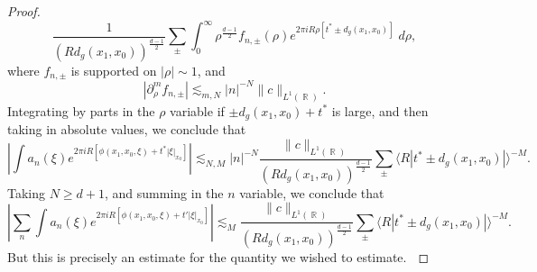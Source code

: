 \documentclass[dvipsnames,letterpaper,12pt]{article}
\DeclareMathOperator{\RR}{\mathbb{R}}
\begin{document}
\begin{proof}
    \[ \frac{1}{\left( R d_g(x_1,x_0) \right)^{\frac{d-1}{2}}} \sum_{\pm} \int_0^\infty \rho^{\frac{d-1}{2}} f_{n,\pm}(\rho) e^{2 \pi i R \rho [ t^* \pm d_g(x_1,x_0)]}\; d\rho, \]
    where $f_{n,\pm}$ is supported on $|\rho| \sim 1$, and
    \[ |\partial_\rho^m f_{n,\pm}| \lesssim_{m,N} |n|^{-N} \| c \|_{L^1(\RR)}. \]
    Integrating by parts in the $\rho$ variable if $\pm d_g(x_1,x_0) + t^*$ is large, and then taking in absolute values, we conclude that
    \[ \left| \int a_n(\xi) e^{2 \pi i R [ \phi(x_1,x_0,\xi) + t^* |\xi|_{x_0} ]} \right| \lesssim_{N,M} |n|^{-N} \frac{\| c \|_{L^1(\RR)}}{( R d_g(x_1,x_0) )^{\frac{d-1}{2}}} \sum_{\pm} \langle R |t^* \pm d_g(x_1,x_0)| \rangle^{-M}. \]
    Taking $N \geq d + 1$, and summing in the $n$ variable, we conclude that
    \[ \left| \sum_n \int a_n(\xi) e^{2 \pi i R [ \phi(x_1,x_0,\xi) + t' |\xi|_{x_0} ]} \right| \lesssim_M \frac{\| c \|_{L^1(\RR)}}{( R d_g(x_1,x_0) )^{\frac{d-1}{2}}} \sum_{\pm} \langle R | t^* \pm d_g(x_1,x_0)| \rangle^{-M}. \]
    But this is precisely an estimate for the quantity we wished to estimate. $\qedhere$





\end{proof}
\end{document}
